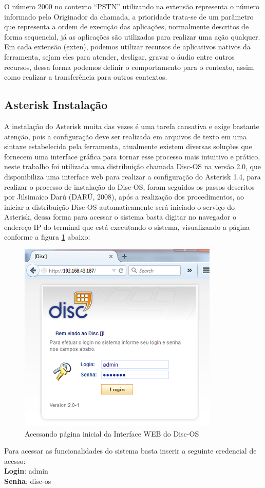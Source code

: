 O número 2000 no contexto “PSTN” utilizando na extensão representa o número informado pelo Originador da chamada, a prioridade trata-se de um parâmetro que representa a ordem de execução das aplicações, normalmente descritos de forma sequencial, já as aplicações são utilizadas para realizar uma ação qualquer. Em cada extensão (exten), podemos utilizar recursos de aplicativos nativos da ferramenta, sejam eles para atender, desligar, gravar o áudio entre outros recursos, dessa forma podemos definir o comportamento para o contexto, assim como realizar a transferência para outros contextos.


\subsection{Asterisk Instalação}

A instalação do Asterisk muita das vezes é uma tarefa cansativa e exige bastante atenção, pois a configuração deve ser realizada em arquivos de texto em uma sintaxe estabelecida pela ferramenta, atualmente existem diversas soluções que fornecem uma interface gráfica para tornar esse processo mais intuitivo e prático, neste trabalho foi utilizada uma distribuição chamada Disc-OS na versão 2.0, que disponibiliza uma interface web para realizar a configuração do Asterisk 1.4, para realizar o processo de instalação do Disc-OS, foram seguidos os passos descritos por Jilsimaico Darú (DARÚ, 2008), após a realização dos procedimentos, ao iniciar a distribuição Disc-OS automaticamente será iniciado o serviço do Asterisk, dessa forma para acessar o sistema basta digitar no navegador o endereço IP do terminal que está executando o sistema, visualizando a página conforme a figura \ref{figura:asteriskInterfaceWeb} abaixo:


\begin{figure}[!htb]
	\centering
	\caption{Acessando página inicial da Interface WEB do Disc-OS}	
	\label{figura:asteriskInterfaceWeb}
	\includegraphics{figuras/pagina_inicial_asterisk.png}
\end{figure}


Para acessar as funcionalidades do sistema basta inserir a seguinte credencial de acesso:\\
\textbf{Login}: admin\\
\textbf{Senha}: disc-os\\
